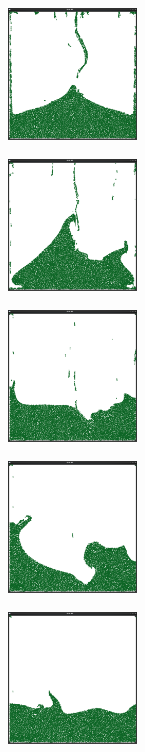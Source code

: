 \begin{figure}[ht!]
\begin{subfigure}[]{}
\includegraphics[height=35mm]{png/pcg4.png}
\end{subfigure}
\begin{subfigure}[]{}
\includegraphics[height=35mm]{png/pcg5.png}
\end{subfigure}
\begin{subfigure}[]{}
\includegraphics[height=35mm]{png/pcg6.png}
\end{subfigure}
\begin{subfigure}[]{}
\includegraphics[height=35mm]{png/pcg7.png}
\end{subfigure}
\begin{subfigure}[]{}
\includegraphics[height=35mm]{png/pcg8.png}
\end{subfigure}

\end{figure}
